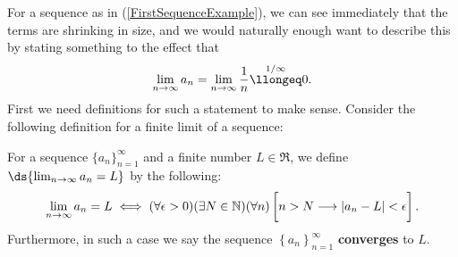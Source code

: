 For a sequence as in (\ref{FirstSequenceExample}), we can
see immediately that the terms are shrinking in size, 
and we would naturally enough want to describe this by 
stating something to the effect that
$$\lim_{n\to\infty}a_n=\lim_{n\to\infty}\frac1n
\overset{1/\infty}{\llongeq}0.$$
First we need definitions for such a statement to make sense.
Consider the following definition for a finite limit of a 
sequence:
\begin{definition}
For a sequence $\{a_n\}_{n=1}^\infty$ and a finite number $L\in\Re$,
we define $\ds{\lim_{n\to\infty}a_n=L}$ by the following:
\begin{equation}
\lim_{n\to\infty}a_n=L\iff
(\forall \epsilon>0)(\exists N\in{\mathbb{N}})
(\forall n)\left[\vphantom{\frac11}n>N\longrightarrow
\left|a_n-L\right|<\epsilon\right].
\label{FiniteLimitOfASequence}\end{equation}
Furthermore, in such a case we say the sequence 
$\left\{a_n\right\}_{n=1}^\infty$ {\bf converges} to $L$.
\end{definition}


